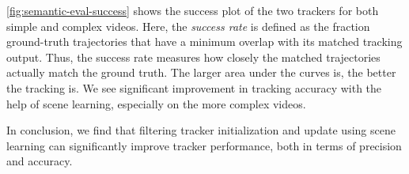 


\ref{fig:semantic-eval-success} shows the success plot of the two trackers for both simple and complex videos.
Here, the {\it success rate} is defined as the fraction ground-truth trajectories that have a minimum overlap with its matched tracking output.
Thus, the success rate measures how closely the matched trajectories actually match the ground truth.
The larger area under the curves is, the better the tracking is.
We see significant improvement in tracking accuracy with the help of scene learning, especially on the more complex videos.


In conclusion, we find that filtering tracker initialization and update using scene learning can significantly improve tracker performance, both in terms of precision and accuracy.  



